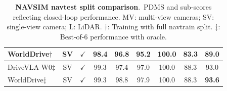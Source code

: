 \begin{table}[t]
\begin{tabular}{l|c|c|cc|cccc}
        WorldDrive$\dagger$ & SV & $\checkmark$ & 98.4 & 96.8 & 95.2  & 100.0 & 83.3 & \textbf{89.0} \\
        \midrule
        DriveVLA-W0$\ddagger$ & SV & $\checkmark$ & 99.3 & 97.4 & 97.0 & 100.0 & 88.3 & 93.0 \\
        \rowcolor{gray!20}
        WorldDrive$\ddagger$ & SV & $\checkmark$ & 99.3 & 98.8 & 97.9 & 100.0 & 88.3 & \textbf{93.6} \\
        \bottomrule[1.5pt]
        \end{tabular}
\caption{\textbf{NAVSIM navtest split comparison}.~PDMS and sub-scores reflecting closed-loop performance. MV: multi-view cameras; SV: single-view camera; L: LiDAR. $\dagger$: Training with full navtrain split. $\ddagger$: Best-of-6 performance with oracle.}
\label{tab:closeloop_turn}
\end{table}

